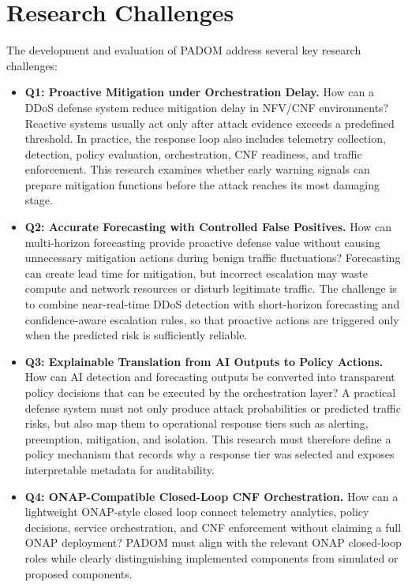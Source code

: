 \documentclass[12pt, a4paper, reqno, oneside]{book}
\newcommand{\padonap}{\textsc{PADOM}}
\begin{document}
\section{Research Challenges}

The development and evaluation of \padonap{} address several key research
challenges:

\begin{itemize}
    \item \textbf{Q1: Proactive Mitigation under Orchestration Delay.}
    How can a DDoS defense system reduce mitigation delay in NFV/CNF environments? Reactive systems usually act only after attack evidence exceeds a predefined threshold. In practice, the response loop also includes telemetry collection, detection, policy evaluation, orchestration, CNF readiness, and traffic enforcement. This research examines whether early warning signals can prepare mitigation functions before the attack reaches its most damaging stage.

    \item \textbf{Q2: Accurate Forecasting with Controlled False Positives.}
    How can multi-horizon forecasting provide proactive defense value without
    causing unnecessary mitigation actions during benign traffic fluctuations?
    Forecasting can create lead time for mitigation, but incorrect escalation may
    waste compute and network resources or disturb legitimate traffic. The
    challenge is to combine near-real-time DDoS detection with short-horizon
    forecasting and confidence-aware escalation rules, so that proactive actions
    are triggered only when the predicted risk is sufficiently reliable.

    \item \textbf{Q3: Explainable Translation from AI Outputs to Policy Actions.}
    How can AI detection and forecasting outputs be converted into transparent
    policy decisions that can be executed by the orchestration layer? A practical
    defense system must not only produce attack probabilities or predicted
    traffic risks, but also map them to operational response tiers such as
    alerting, preemption, mitigation, and isolation. This research must therefore
    define a policy mechanism that records why a response tier was selected and
    exposes interpretable metadata for auditability.

    \item \textbf{Q4: ONAP-Compatible Closed-Loop CNF Orchestration.}
    How can a lightweight ONAP-style closed loop connect telemetry analytics,
    policy decisions, service orchestration, and CNF enforcement without claiming
    a full ONAP deployment? \padonap{} must align with the relevant ONAP
    closed-loop roles while clearly distinguishing implemented components from
    simulated or proposed components.


\end{itemize}
\end{document}
